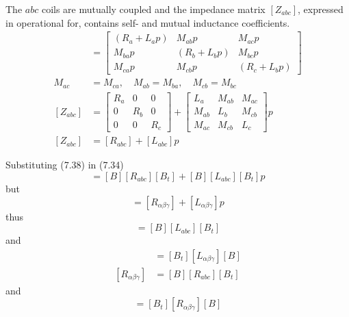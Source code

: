 \documentclass[a4paper,numbers=noenddot,12pt]{scrbook}
\begin{document}
        The $abc$ coils are mutually coupled and the impedance matrix $[Z_{abc}]$, expressed in operational for, contains self- and mutual inductance coefficients.
        \begin{align}
            [Z_{abc}]
            & =
            \begin{bmatrix}
                (R_a + L_a p) & M_{ab} p & M_{ac} p \\
                M_{ba} p & (R_b + L_b p) & M_{bc} p \\
                M_{ca} p & M_{cb} p & (R_c + L_b p)
            \end{bmatrix} \\
            M_{ac} & = M_{ca}, \quad M_{ab} = M_{ba}, \quad M_{cb} = M_{bc} \nonumber \\
            [Z_{abc}] & =
            \begin{bmatrix}
                R_a & 0 & 0 \\
                0 & R_b & 0 \\
                0 & 0 & R_c
            \end{bmatrix}
            +
            \begin{bmatrix}
                L_a & M_{ab} & M_{ac} \\
                M_{ab} & L_b & M_{cb} \\
                M_{ac} & M_{cb} & L_c
            \end{bmatrix}
            p \\
            [Z_{abc}] & = [R_{abc}] + [L_{abc}] p
            \label{eq:Eq7.38}
        \end{align}

        Substituting (7.38) in (7.34)
        \begin{equation}
            [Z_{\alpha \beta \gamma}] = [B][R_{abc}][B_t] + [B][L_{abc}][B_t]p
            \label{eq:Eq7.39}
        \end{equation}
        but
        \begin{equation}
            [Z_{\alpha \beta \gamma}] = [R_{\alpha \beta \gamma}] + [L_{\alpha \beta \gamma}]p
            \label{eq:Eq7.40}
        \end{equation}
        thus
        \begin{equation}
            [L_{\alpha \beta \gamma}] = [B][L_{abc}][B_t]
            \label{eq:Eq7.41}
        \end{equation}
        and
        \begin{align}
            [L_{abc}] & = [B_t][L_{\alpha \beta \gamma}][B] \\
            [R_{\alpha \beta \gamma}] & = [B][R_{abc}][B_t]
            \label{eq:Eq7.43}
        \end{align}
        and
        \begin{equation}
            [R_{abc}] = [B_t][R_{\alpha \beta \gamma}][B]
            \label{eq:Eq7.44}
        \end{equation}
\end{document}
